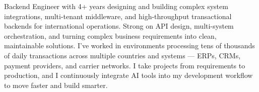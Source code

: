 

\begin{cvparagraph}

Backend Engineer with 4+ years designing and building complex system integrations, multi-tenant middleware, and high-throughput transactional backends for international operations. Strong on API design, multi-system orchestration, and turning complex business requirements into clean, maintainable solutions. I've worked in environments processing tens of thousands of daily transactions across multiple countries and systems --- ERPs, CRMs, payment providers, and carrier networks. I take projects from requirements to production, and I continuously integrate AI tools into my development workflow to move faster and build smarter.
\end{cvparagraph}
